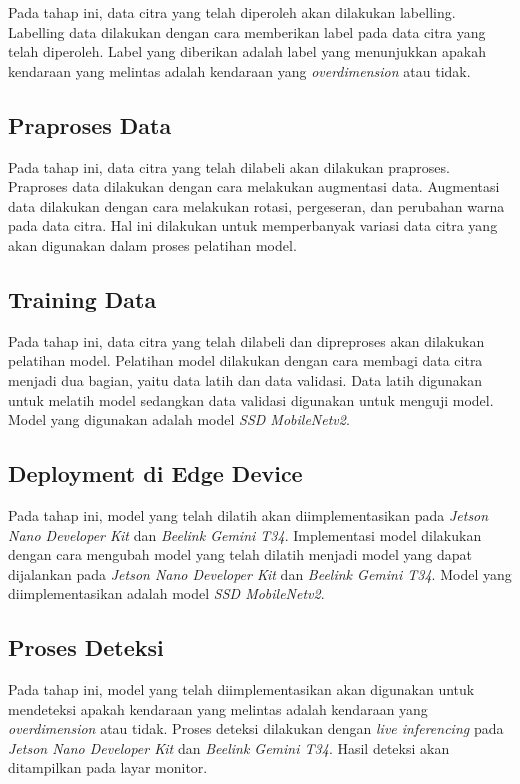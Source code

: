 Pada tahap ini, data citra yang telah diperoleh akan dilakukan labelling. Labelling data dilakukan dengan cara memberikan label pada data citra yang telah diperoleh. Label yang diberikan adalah label yang menunjukkan apakah kendaraan yang melintas adalah kendaraan yang \emph{overdimension} atau tidak.

\subsection{Praproses Data}

Pada tahap ini, data citra yang telah dilabeli akan dilakukan praproses. Praproses data dilakukan dengan cara melakukan augmentasi data. Augmentasi data dilakukan dengan cara melakukan rotasi, pergeseran, dan perubahan warna pada data citra. Hal ini dilakukan untuk memperbanyak variasi data citra yang akan digunakan dalam proses pelatihan model.

\subsection{Training Data}

Pada tahap ini, data citra yang telah dilabeli dan dipreproses akan dilakukan pelatihan model. Pelatihan model dilakukan dengan cara membagi data citra menjadi dua bagian, yaitu data latih dan data validasi. Data latih digunakan untuk melatih model sedangkan data validasi digunakan untuk menguji model. Model yang digunakan adalah model \emph{SSD MobileNetv2}.

\subsection{Deployment di Edge Device}

Pada tahap ini, model yang telah dilatih akan diimplementasikan pada \emph{Jetson Nano Developer Kit} dan \emph{Beelink Gemini T34}. Implementasi model dilakukan dengan cara mengubah model yang telah dilatih menjadi model yang dapat dijalankan pada \emph{Jetson Nano Developer Kit} dan \emph{Beelink Gemini T34}. Model yang diimplementasikan adalah model \emph{SSD MobileNetv2}.

\subsection{Proses Deteksi}

Pada tahap ini, model yang telah diimplementasikan akan digunakan untuk mendeteksi apakah kendaraan yang melintas adalah kendaraan yang \emph{overdimension} atau tidak. Proses deteksi dilakukan dengan \emph{live inferencing} pada \emph{Jetson Nano Developer Kit} dan \emph{Beelink Gemini T34}. Hasil deteksi akan ditampilkan pada layar monitor.

